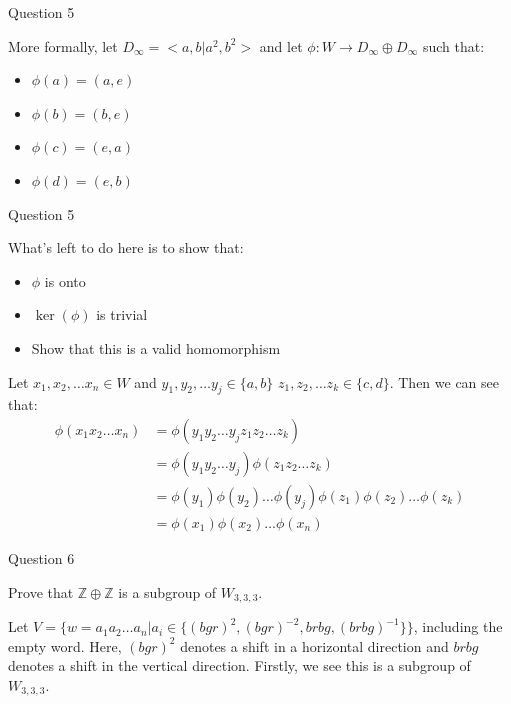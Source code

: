 \documentclass[usenames,dvipsnames]{beamer}
\newcommand{\Z}{\mathbb{Z}}
\begin{document}
\begin{frame}{Question 5}

More formally, let $D_\infty=<a,b|a^2,b^2>$ and let $\phi:W\rightarrow D_\infty \oplus D_\infty$ such that:

 \pause{}

\begin{itemize}
  \item $\phi(a)=(a,e)$
  \item $\phi(b)=(b,e)$
  \item $\phi(c)=(e,a)$
  \item $\phi(d)=(e,b)$
\end{itemize}

\end{frame}

\begin{frame}{Question 5}

What's left to do here is to show that:

\begin{itemize}
\item $\phi$ is onto
\item $\ker(\phi)$ is trivial
\item Show that this is a valid homomorphism
\end{itemize}

Let $x_1,x_2, \ldots x_n \in W$ and  $y_1,y_2, \ldots y_j\in \{a,b\}$ $z_1,z_2, \ldots z_k\in \{c,d\}$.
Then we can see that:
\begin{align*}
\phi(x_1x_2 \ldots x_n)
&=\phi(y_1y_2 \ldots y_jz_1z_2 \ldots z_k)\\
&=\phi(y_1y_2 \ldots y_j)\phi(z_1z_2 \ldots z_k)\\
&=\phi(y_1)\phi(y_2) \ldots \phi(y_j)\phi(z_1)\phi(z_2) \ldots \phi(z_k)\\
&=\phi(x_1)\phi(x_2) \ldots \phi(x_n)
\end{align*}
\end{frame}

\begin{frame}{Question 6}

Prove that $\Z \oplus \Z$ is a subgroup of $W_{3,3,3}$.\\

\pause{}

Let $V=\{w={a_1a_2\ldots a_n} | a_i\in\{(bgr)^2,(bgr)^{-2},brbg,(brbg)^{-1}\}\}$, including the empty word.
Here, $(bgr)^2$ denotes a shift in a horizontal direction and $brbg$ denotes a shift in the vertical
direction. Firstly, we see this is a subgroup of $W_{3,3,3}$.

\end{frame}
\end{document}
